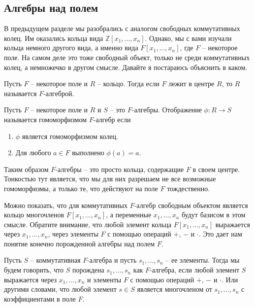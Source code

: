 \subsection{Алгебры над полем}

В предыдущем разделе мы разобрались с аналогом свободных коммутативных колец.
Им оказались кольца вида $\mathbb Z[x_1,\ldots,x_n]$.
Однако, мы с вами изучали кольца немного другого вида, а именно вида $F[x_1,\ldots,x_n]$, где $F$ -- некоторое поле.
На самом деле это тоже свободный объект, только не среди коммутативных колец, а немножечко в другом смысле.
Давайте я постараюсь объяснить в каком.

\begin{definition}
\label{def::FAlg}
Пусть $F$ -- некоторое поле и $R$ -- кольцо.
Тогда если $F$ лежит в центре $R$, то $R$ называется $F$-алгеброй.
\end{definition}

\begin{definition}
\label{def::FAlgHom}
Пусть $F$ -- некоторое поле и $R$ и $S$ -- это $F$-алгебры.
Отображение $\phi\colon R\to S$ называется гомоморфизмом $F$-алгебр если
\begin{enumerate}
\item $\phi$ является гомоморфизмом колец.

\item Для любого $a\in F$ выполнено $\phi(a) = a$.
\end{enumerate}
\end{definition}

Таким образом $F$-алгебры -- это просто кольца, содержащие $F$ в своем центре.
Тонкостью тут является, что мы для них разрешаем не все возможные гомоморфизмы, а только те, что действуют на поле $F$ тождественно.

Можно показать, что для коммутативных $F$-алгебр свободным объектом является кольцо многочленов $F[x_1,\ldots,x_n]$, а переменные $x_1,\ldots,x_n$ будут базисом в этом смысле.
Обратите внимание, что любой элемент кольца $F[x_1,\ldots,x_n]$ выражается через $x_1,\ldots,x_n$, через элементы $F$ с помощью операций $+$, $-$ и $\cdot$.
Это дает нам понятие конечно порожденной алгебры над полем $F$.

\begin{definition}
\label{def::FAlgGen}
Пусть $S$ -- коммутативная $F$-алгебра и пусть $s_1,\ldots,s_n$ -- ее элементы.
Тогда мы будем говорить, что $S$ порождена $s_1,\ldots, s_n$ как $F$-алгебра, если любой элемент $S$ выражается через $x_1,\ldots,x_n$ и элементы $F$ с помощью операций $+$, $-$ и $\cdot$.
Или другими словами, что любой элемент $s\in S$ является многочленом от $s_1,\ldots,s_n$ с коэффициентами в поле $F$.
\end{definition}

